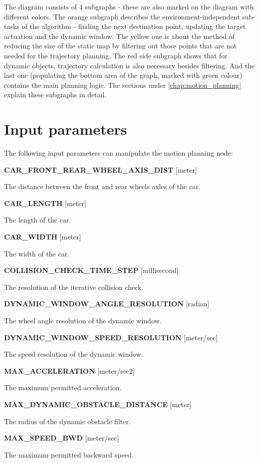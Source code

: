 The diagram consists of 4 subgraphs - these are also marked on the diagram with different colors. The orange subgraph describes the environment-independent sub-tasks of the algorithm - finding the next destination point, updating the target actuation and the dynamic window. The yellow one is about the method of reducing the size of the static map by filtering out those points that are not needed for the trajectory planning. The red side subgraph shows that for dynamic objects, trajectory calculation is also necessary besides filtering. And the last one (populating the bottom area of the graph, marked with green colour) contains the main planning logic. The sections under \ref{chap:motion_planning} explain these subgraphs in detail.

\section{Input parameters}
\label{chap:input_parameters}
The following input parameters can manipulate the motion planning node:

\textbf{CAR\_FRONT\_REAR\_WHEEL\_AXIS\_DIST} [meter]

The distance between the front and rear wheels axles of the car.

\textbf{CAR\_LENGTH} [meter]

The length of the car.

\textbf{CAR\_WIDTH} [meter]

The width of the car.

\textbf{COLLISION\_CHECK\_TIME\_STEP} [millisecond]

The resolution of the iterative collision check.

\textbf{DYNAMIC\_WINDOW\_ANGLE\_RESOLUTION} [radian]

The wheel angle resolution of the dynamic window.

\textbf{DYNAMIC\_WINDOW\_SPEED\_RESOLUTION} [meter/sec]

The speed resolution of the dynamic window.

\textbf{MAX\_ACCELERATION} [meter/sec2]

The maximum permitted acceleration.

\textbf{MAX\_DYNAMIC\_OBSTACLE\_DISTANCE} [meter]

The radius of the dynamic obstacle filter.

\textbf{MAX\_SPEED\_BWD} [meter/sec]

The maximum permitted backward speed.

